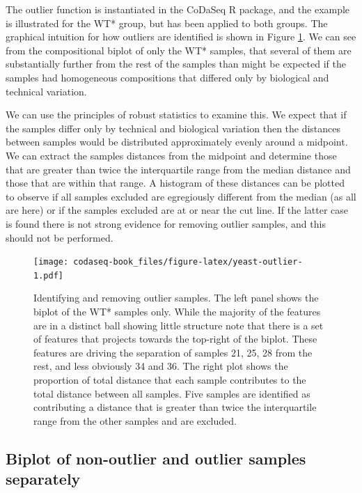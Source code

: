 \documentclass[
  onecolumn]{article}
\begin{document}
The outlier function is instantiated in the CoDaSeq R package, and the example is illustrated for the WT* group, but has been applied to both groups. The graphical intuition for how outliers are identified is shown in Figure \ref{fig:yeast-outlier}. We can see from the compositional biplot of only the WT* samples, that several of them are substantially further from the rest of the samples than might be expected if the samples had homogeneous compositions that differed only by biological and technical variation.

We can use the principles of robust statistics to examine this. We expect that if the samples differ only by technical and biological variation then the distances between samples would be distributed approximately evenly around a midpoint. We can extract the samples distances from the midpoint and determine those that are greater than twice the interquartile range from the median distance and those that are within that range. A histogram of these distances can be plotted to observe if all samples excluded are egregiously different from the median (as all are here) or if the samples excluded are at or near the cut line. If the latter case is found there is not strong evidence for removing outlier samples, and this should not be performed.

\begin{figure}
\centering
\texttt{[image: codaseq-book\_files/figure-latex/yeast-outlier-1.pdf]}
\caption{\label{fig:yeast-outlier}Identifying and removing outlier samples. The left panel shows the biplot of the WT* samples only. While the majority of the features are in a distinct ball showing little structure note that there is a set of features that projects towards the top-right of the biplot. These features are driving the separation of samples 21, 25, 28 from the rest, and less obviously 34 and 36. The right plot shows the proportion of total distance that each sample contributes to the total distance between all samples. Five samples are identified as contributing a distance that is greater than twice the interquartile range from the other samples and are excluded.}
\end{figure}

\hypertarget{biplot-of-non-outlier-and-outlier-samples-separately}{%
\subsection{Biplot of non-outlier and outlier samples separately}\label{biplot-of-non-outlier-and-outlier-samples-separately}}
\end{document}
